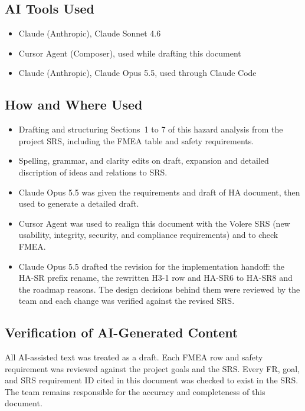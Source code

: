 \documentclass{article}
\begin{document}
\subsection{AI Tools Used}

\begin{itemize}
  \item Claude (Anthropic), Claude Sonnet 4.6
  \item Cursor Agent (Composer), used while drafting this document
  \item Claude (Anthropic), Claude Opus 5.5, used through Claude Code
\end{itemize}

\subsection{How and Where Used}

\begin{itemize}
  \item Drafting and structuring Sections~1 to 7 of this hazard analysis from the
  project SRS, including the FMEA table and safety requirements.
  \item Spelling, grammar, and clarity edits on draft, expansion and detailed discription of ideas and relations to SRS.
  \item Claude Opus 5.5 was given the requirements and draft of HA document, then used to generate a
  detailed draft.
  \item Cursor Agent was used to realign this document with the
  Volere SRS (new usability, integrity, security, and compliance requirements)
  and to check FMEA.
  \item Claude Opus 5.5 drafted the
  revision for the implementation handoff: the HA-SR prefix rename, the
  rewritten H3-1 row and HA-SR6 to HA-SR8 and the roadmap reasons. The design
  decisions behind them were reviewed by the team and each change was verified 
  against the revised SRS.
\end{itemize}

\subsection{Verification of AI-Generated Content}

All AI-assisted text was treated as a draft. Each FMEA row and safety
requirement was reviewed against the project goals and the SRS. Every FR,
goal, and SRS requirement ID cited in this document was checked to exist in
the SRS. The team remains responsible for the accuracy and completeness of this document.
\end{document}
